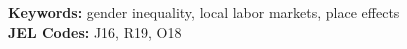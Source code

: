 \documentclass[11pt,final]{article}
\begin{document}
\maketitle






\noindent\textbf{Keywords:} gender inequality, local labor markets, place effects \\
\noindent\textbf{JEL Codes:} J16, R19, O18

\newpage













%

%


\clearpage

{}



	
	
\end{document}
